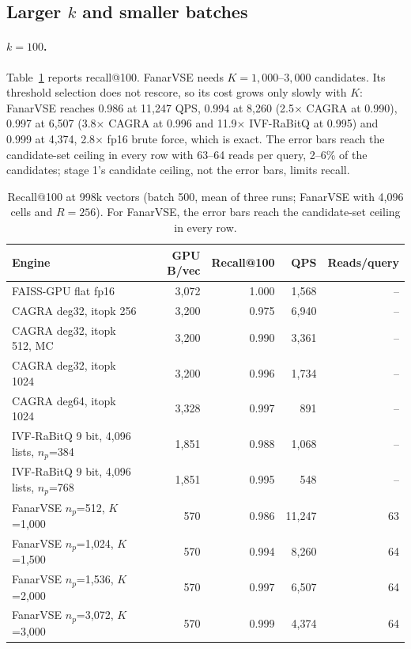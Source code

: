 \documentclass[fleqn,10pt]{wlscirep}
\begin{document}
\subsection{\texorpdfstring{Larger $k$ and smaller batches}{Larger k and smaller batches}}
\paragraph{$k=100$.} Table~\ref{tab:k100} reports recall@100. FanarVSE needs $K=1{,}000$--$3{,}000$ candidates. Its threshold selection does not rescore, so its cost grows only slowly with $K$: FanarVSE reaches 0.986 at 11{,}247 QPS, 0.994 at 8{,}260 (2.5$\times$ CAGRA at 0.990), 0.997 at 6{,}507 (3.8$\times$ CAGRA at 0.996 and 11.9$\times$ IVF-RaBitQ at 0.995) and 0.999 at 4{,}374, 2.8$\times$ fp16 brute force, which is exact. The error bars reach the candidate-set ceiling in every row with 63--64 reads per query, 2--6\% of the candidates; stage 1's candidate ceiling, not the error bars, limits recall.

\begin{table}[!htbp]
\caption{Recall@100 at 998k vectors (batch 500, mean of three runs; FanarVSE with 4{,}096 cells and $R=256$). For FanarVSE, the error bars reach the candidate-set ceiling in every row.}
\label{tab:k100}
\small
\begin{tabular}{lrrrr}
\toprule
Engine & GPU B/vec & Recall@100 & QPS & Reads/query \\
\midrule
FAISS-GPU flat fp16 & 3{,}072 & 1.000 & 1{,}568 & -- \\
CAGRA deg32, itopk 256 & 3{,}200 & 0.975 & 6{,}940 & -- \\
CAGRA deg32, itopk 512, MC & 3{,}200 & 0.990 & 3{,}361 & -- \\
CAGRA deg32, itopk 1024 & 3{,}200 & 0.996 & 1{,}734 & -- \\
CAGRA deg64, itopk 1024 & 3{,}328 & 0.997 & 891 & -- \\
IVF-RaBitQ 9 bit, 4{,}096 lists, $n_p$=384 & 1{,}851 & 0.988 & 1{,}068 & -- \\
IVF-RaBitQ 9 bit, 4{,}096 lists, $n_p$=768 & 1{,}851 & 0.995 & 548 & -- \\
FanarVSE $n_p$=512, $K$=1{,}000 & 570 & 0.986 & 11{,}247 & 63 \\
FanarVSE $n_p$=1{,}024, $K$=1{,}500 & 570 & 0.994 & 8{,}260 & 64 \\
FanarVSE $n_p$=1{,}536, $K$=2{,}000 & 570 & 0.997 & 6{,}507 & 64 \\
FanarVSE $n_p$=3{,}072, $K$=3{,}000 & 570 & 0.999 & 4{,}374 & 64 \\
\bottomrule
\end{tabular}
\end{table}
\end{document}
